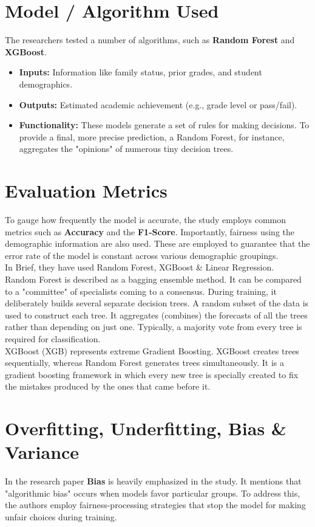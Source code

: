 \documentclass[12pt]{article}
\begin{document}
\section{Model / Algorithm Used}
The researchers tested a number of algorithms, such as \textbf{Random Forest} and \textbf{XGBoost}. 
\begin{itemize}
    \item \textbf{Inputs:} Information like family status, prior grades, and student demographics.
    \item \textbf{Outputs:} Estimated academic achievement (e.g., grade level or pass/fail).
    \item \textbf{Functionality:} These models generate a set of rules for making decisions. To provide a final, more precise prediction, a Random Forest, for instance, aggregates the "opinions" of numerous tiny decision trees.
\end{itemize}

\section{Evaluation Metrics}
To gauge how frequently the model is accurate, the study employs common metrics such as \textbf{Accuracy} and the \textbf{F1-Score}. Importantly, fairness using the demographic information are also used. These are employed to guarantee that the error rate of the model is constant across various demographic groupings. \\
In Brief, they have used Random Forest, XGBoost \& Linear Regression. \\
Random Forest is described as a bagging ensemble method. It can be compared to a "committee" of specialists coming to a consensus. During training, it deliberately builds several separate decision trees. A random subset of the data is used to construct each tree.
It aggregates (combines) the forecasts of all the trees rather than depending on just one. Typically, a majority vote from every tree is required for classification. \\
XGBoost (XGB) represents extreme Gradient Boosting. XGBoost creates trees sequentially, whereas Random Forest generates trees simultaneously. It is a gradient boosting framework in which every new tree is specially created to fix the mistakes produced by the ones that came before it. 

\section{Overfitting, Underfitting, Bias \& Variance}
In the research paper \textbf{Bias} is heavily emphasized in the study. It mentions that "algorithmic bias" occurs when models favor particular groups. To address this, the authors employ fairness-processing strategies that stop the model for making unfair choices during training.
\end{document}
